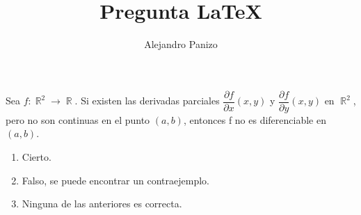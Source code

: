 \documentclass[10pt,spanish,hyperref={pdfpagelabels=false}]{beamer}
\author{Alejandro Panizo}
\title{Pregunta \LaTeX}
\DeclareMathOperator{\RR}{\mathbb{R}}
\begin{document}
\Large

\rightskip=0pt

\begin{frame}

Sea $f :\RR ^2 \to \RR$. Si existen las derivadas parciales  $\dfrac{\partial f}{\partial x} (x,y)$ y $\dfrac{\partial f}{\partial y} (x,y)$  en $\RR ^2$, pero no son continuas en el punto $(a,b)$, entonces f no es diferenciable en $(a,b)$.
\medskip



\begin{enumerate}[1.] \rightskip=0pt
\item Cierto.
\item Falso, se puede encontrar un contraejemplo.
\item Ninguna de las anteriores es correcta.
\end{enumerate}


\end{frame}
\end{document}
